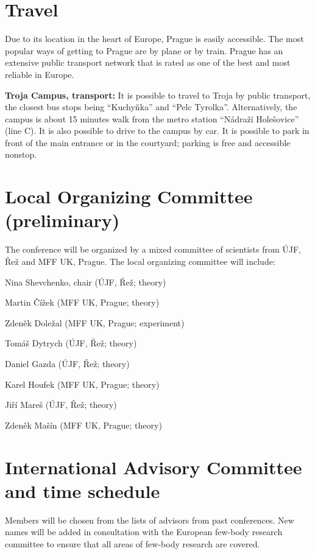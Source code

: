 \documentclass[12pt]{extarticle}
\newcommand{\dg}[1]{\todo[inline]{DG: #1}}
\newcommand*\sq{\mathbin{\vcenter{\hbox{\rule{.8ex}{.8ex}}}}}
\newenvironment{t_sq_itemize}
{\begin{itemize}[topsep=0pt, parsep=0pt, itemsep=0pt, leftmargin=*]
    \renewcommand{\labelitemi}{{\(\sq\)}}}
  {\end{itemize}}
\begin{document}
\section*{Travel}
\noindent
%
Due to its location in the heart of Europe, Prague is easily
accessible. The most popular ways of getting to Prague are by plane or
by train. Prague has an extensive public transport network that is
rated as one of the best and most reliable in Europe.

{\bf Troja Campus, transport:} It is possible to travel to Troja by public transport, the closest bus stops being “Kuchyňka”
and “Pelc Tyrolka”. Alternatively, the campus is about 15 minutes walk from the metro station “Nádraží Holešovice”
(line C). It is also possible to drive to the campus by car. It is possible to park in front of the main entrance or in the courtyard;
parking is free and accessible nonstop.


\section*{Local Organizing Committee (preliminary)}
\noindent
%
The conference will be organized by a mixed committee of scientists from ÚJF, Řež and MFF UK, Prague.
The local organizing committee will include:
\begin{t_sq_itemize}
\item Nina Shevchenko, chair (ÚJF, Řež; theory)
\item Martin Čížek (MFF UK, Prague; theory)
\item Zdeněk Doležal (MFF UK, Prague; experiment)
\item Tomáš Dytrych (ÚJF, Řež; theory)
\item Daniel Gazda (ÚJF, Řež; theory)
\item Karel Houfek (MFF UK, Prague; theory)
\item Jiří Mareš (ÚJF, Řež; theory)
\item Zdeněk Mašín (MFF UK, Prague; theory)
\end{t_sq_itemize}
\dg{Exp.\ UOCHB, JH?}

\section*{International Advisory Committee and time schedule}
\noindent
%
Members will be chosen from the lists of advisors from past conferences. New names
will be added in consultation with the European few-body research committee to ensure that all
areas of few-body research are covered. 
\end{document}
